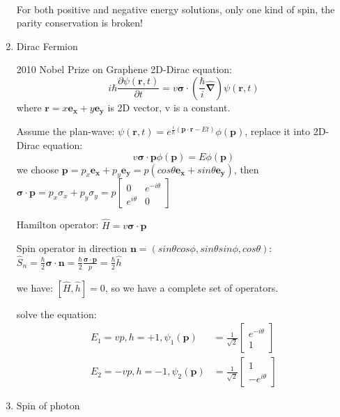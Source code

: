 \documentclass[12pt]{article}
\numberwithin{equation}{section}
\begin{document}
\begin{enumerate}
\begin{equation}
\begin{split}
	\end{split}\end{equation}
	For both positive and negative energy solutions, only one kind of spin, the parity conservation is broken!
\item Dirac Fermion\par
	2010 Nobel Prize on Graphene
	2D-Dirac equation:
	\begin{equation}
		i\hbar\frac{\partial \psi(\bm{r},t)}{\partial t}=
		v\bm{\sigma}\cdot(\frac{\hbar}{i}\hat{\bm{\nabla}})\psi(\bm{r},t)
	\end{equation}
	where $\bm{r}=x\bm{e_x}+y\bm{e_y}$ is 2D vector, v is a constant.\par
	Assume the plan-wave: $\psi(\mathbf{r},t)=e^{\frac{i}{\hbar}(\bm{p} \cdot \bm{r}-Et)}\phi(\bm{p})$, replace it into 2D-Dirac equation:
	\begin{equation}
		v\bm{\sigma}\cdot\bm{p}\phi(\bm{p})=E\phi(\bm{p})
	\end{equation}
	we choose $\bm{p}=p_x\bm{e_x}+p_y\bm{e_y}=p(cos\theta\bm{e_x}+sin\theta\bm{e_y})$, then $\bm{\sigma}\cdot\bm{p}=p_x\sigma_x+p_y\sigma_y=p\begin{bmatrix}0&e^{-i\theta}\\e^{i\theta}&0\end{bmatrix}$\par
	Hamilton operator: $\hat{H}=v\bm{\sigma}\cdot\bm{p}$\par
	Spin operator in direction $\bm{n}=(sin\theta cos\phi, sin\theta sin\phi, cos\theta)$: 
	$\hat{S}_n=\frac{\hbar}{2}\bm{\sigma}\cdot\bm{n}
	=\frac{\hbar}{2}\frac{\bm{\sigma}\cdot\bm{p}}{p}=\frac{\hbar}{2}\hat{h}$ \par
	we have: $[\hat{H},\hat{h}]=0$, so we have a complete set of operators.\par
	solve the equation: 
	\begin{equation}\begin{split}
		E_1=vp, h=+1, \psi_1(\bm{p})&=\frac{1}{\sqrt{2}}\begin{bmatrix}e^{-i\theta} \\ 1\end{bmatrix}\\
		E_2=-vp, h=-1, \psi_2(\bm{p})&=\frac{1}{\sqrt{2}}\begin{bmatrix}1 \\ -e^{i\theta}\end{bmatrix}
	\end{split}\end{equation}
\item Spin of photon\par

\end{enumerate}
\end{document}
